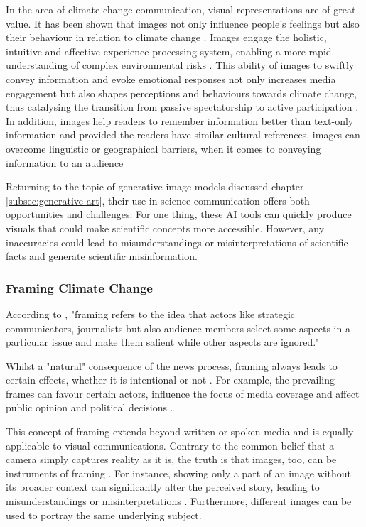 In the area of climate change communication, visual representations are of great value. It has been shown that images not only influence people's feelings but also their behaviour in relation to climate change \parencite{Leiserowitz2006}. Images engage the holistic, intuitive and affective experience processing system, enabling a more rapid understanding of complex environmental risks \parencite{Epstein1994, Joffe2008}. This ability of images to swiftly convey information and evoke emotional responses not only increases media engagement but also shapes perceptions and behaviours towards climate change, thus catalysing the transition from passive spectatorship to active participation \parencite{Keib2018}. In addition, images help readers to remember information better than text-only information \parencite{Coleman2009, Graber1990} and provided the readers have similar cultural references, images can overcome linguistic or geographical barriers, when it comes to conveying information to an audience \parencite{Armfield2013}

Returning to the topic of generative image models discussed chapter \ref{subsec:generative-art}, their use in science communication offers both opportunities and challenges: For one thing, these AI tools can quickly produce visuals that could make scientific concepts more accessible. However, any inaccuracies could lead to misunderstandings or misinterpretations of scientific facts and generate scientific misinformation.

\subsubsection{Framing Climate Change}

According to \textcite{Sikorski2020}, "framing refers to the idea that actors like strategic communicators, journalists but also audience members select some aspects in a particular issue and make them salient while other aspects are ignored."

Whilst a "natural" consequence of the news process, framing always leads to certain effects, whether it is intentional or not \parencite[91]{ONeill2022}. For example, the prevailing frames can favour certain actors, influence the focus of media coverage and affect public opinion and political decisions \parencite{Nisbet2006}. 

This concept of framing extends beyond written or spoken media and is equally applicable to visual communications. Contrary to the common belief that a camera simply captures reality as it is, the truth is that images, too, can be instruments of framing \parencite[74]{ONeill2014}. For instance, showing only a part of an image without its broader context can significantly alter the perceived story, leading to misunderstandings or misinterpretations \parencite{Fleming2021}. Furthermore, different images can be used to portray the same underlying subject.

